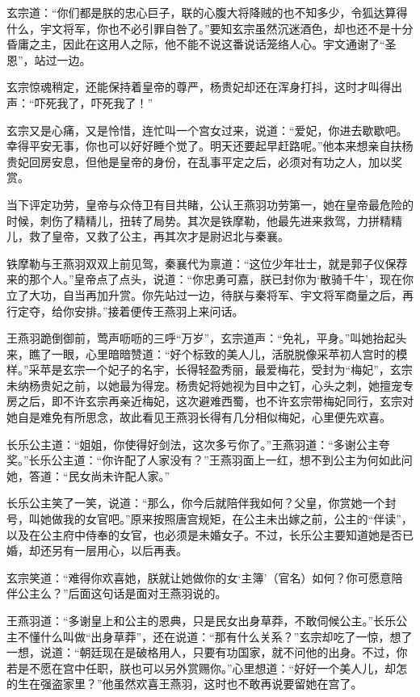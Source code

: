\documentclass[12pt,oneside]{book}
\begin{document}
玄宗道：``你们都是朕的忠心巨子，联的心腹大将降贼的也不知多少，令狐达算得什么，宇文将军，你也不必引罪自咎了。''要知玄宗虽然沉迷酒色，却也还不是十分昏庸之主，因此在这用人之际，他不能不说这番说话笼络人心。宇文通谢了``圣恩''，站过一边。

玄宗惊魂稍定，还能保持着皇帝的尊严，杨贵妃却还在浑身打抖，这时才叫得出声：``吓死我了，吓死我了！''

玄宗又是心痛，又是怜惜，连忙叫一个宫女过来，说道：``爱妃，你进去歇歇吧。幸得平安无事，你也可以好好睡个觉了。明天还要起早赶路呢。''他本来想亲自扶杨贵妃回房安息，但他是皇帝的身份，在乱事平定之后，必须对有功之人，加以奖赏。

当下评定功劳，皇帝与众侍卫有目共睹，公认王燕羽功劳第一，她在皇帝最危险的时候，刺伤了精精儿，扭转了局势。其次是铁摩勒，他最先进来救驾，力拼精精儿，救了皇帝，又救了公主，再其次才是尉迟北与秦襄。

铁摩勒与王燕羽双双上前见驾，秦襄代为禀道：``这位少年壮士，就是郭子仪保荐来的那个人。''皇帝点了点头，说道：``你忠勇可嘉，朕已封你为`散骑千牛'，现在你立了大功，自当再加升赏。你先站过一边，待朕与秦将军、宇文将军商量之后，再行定夺，给你安排。''接着便传王燕羽上来问话。

王燕羽跪倒御前，莺声呖呖的三呼``万岁''，玄宗道声：``免礼，平身。''叫她抬起头来，瞧了一眼，心里暗暗赞道：``好个标致的美人儿，活脱脱像采苹初人宫时的模样。''采苹是玄宗一个妃子的名宇，长得轻盈秀丽，最爱梅花，受封为``梅妃''，玄宗未纳杨贵妃之前，以她最为得宠。杨贵妃将她视为目中之钉，心头之刺，她擅宠专房之后，即不许玄宗再亲近梅妃，这次避难西蜀，也不许玄宗带梅妃同行，玄宗对她自是难免有所思念，故此看见王燕羽长得有几分相似梅妃，心里便先欢喜。

长乐公主道：``姐姐，你使得好剑法，这次多亏你了。''王燕羽道：``多谢公主夸奖。''长乐公主道：``你许配了人家没有？''王燕羽面上一红，想不到公主为何如此问她，答道：``民女尚未许配人家。''

长乐公主笑了一笑，说道：``那么，你今后就陪伴我如何？父皇，你赏她一个封号，叫她做我的女官吧。''原来按照唐宫规矩，在公主未出嫁之前，公主的``伴读''，以及在公主府中侍奉的女官，也必须是未婚女子。不过，长乐公主要知道她是否已婚，却还另有一层用心，以后再表。

玄宗笑道：``难得你欢喜她，朕就让她做你的女`主簿'（官名）如何？你可愿意陪伴公主么？''后面这句话是面对王燕羽说的。

王燕羽道：``多谢皇上和公主的恩典，只是民女出身草莽，不敢伺候公主。''长乐公主不懂什么叫做``出身草莽''，还在说道：``那有什么关系？''玄宗却吃了一惊，想了一想，说道：``朝廷现在是破格用人，只要有功国家，就不问他的出身。不过，你若是不愿在宫中任职，朕也可以另外赏赐你。''心里想道：``好好一个美人儿，却怎的生在强盗家里？''他虽然欢喜王燕羽，这时也不敢再说要留她在宫了。
\end{document}
